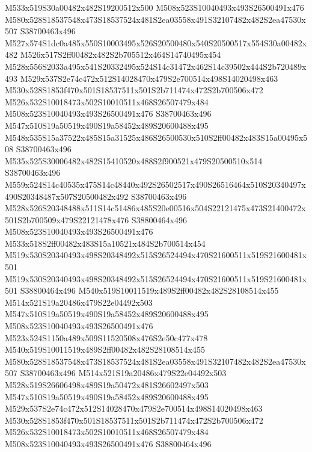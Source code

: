 \documentclass{article}
\begin{document}
\begin{multicols}{2}
M533x519S30a00482x482S19200512x500 M508x523S10040493x493S26500491x476 M580x528S18537548x473S18537524x481S2ea03558x491S32107482x482S2ea47530x507 S38700463x496 M527x574S1dc0a485x550S10003495x526S20500480x540S20500517x554S30a00482x482 M526x517S2ff00482x482S2b705512x464S14740495x454 M528x556S2033a495x541S20332495x524S14c31472x462S14c39502x444S2b720489x493 M529x537S2e74c472x512S14028470x479S2e700514x498S14020498x463 M530x528S1853f470x501S18537511x501S2b711474x472S2b700506x472 M526x532S10018473x502S10010511x468S26507479x484 M508x523S10040493x493S26500491x476 S38700463x496 M547x510S19a50519x490S19a58452x489S20600488x495 M548x535S15a37522x485S15a31525x486S26500530x510S2ff00482x483S15a00495x508 S38700463x496 M535x525S30006482x482S15410520x488S2f900521x479S20500510x514 S38700463x496 M559x524S14c40535x475S14c48440x492S26502517x490S26516464x510S20340497x490S20348487x507S20500482x492 S38700463x496 M528x526S20348488x511S14c51486x485S20e00516x504S22121475x473S21400472x501S2b700509x479S22121478x476 S38800464x496 M508x523S10040493x493S26500491x476 M533x518S2ff00482x483S15a10521x484S2b700514x454 M519x530S20340493x498S20348492x515S26524494x470S21600511x519S21600481x501 M519x530S20340493x498S20348492x515S26524494x470S21600511x519S21600481x501 S38800464x496 M540x519S10011519x489S2ff00482x482S28108514x455 M514x521S19a20486x479S22e04492x503 M547x510S19a50519x490S19a58452x489S20600488x495 M508x523S10040493x493S26500491x476 M523x524S1150a489x509S11520508x476S2e50c477x478 M540x519S10011519x489S2ff00482x482S28108514x455 M580x528S18537548x473S18537524x481S2ea03558x491S32107482x482S2ea47530x507 S38700463x496 M514x521S19a20486x479S22e04492x503 M528x519S26606498x489S19a50472x481S26602497x503 M547x510S19a50519x490S19a58452x489S20600488x495 M529x537S2e74c472x512S14028470x479S2e700514x498S14020498x463 M530x528S1853f470x501S18537511x501S2b711474x472S2b700506x472 M526x532S10018473x502S10010511x468S26507479x484 M508x523S10040493x493S26500491x476 S38800464x496





\end{multicols}
\end{document}

